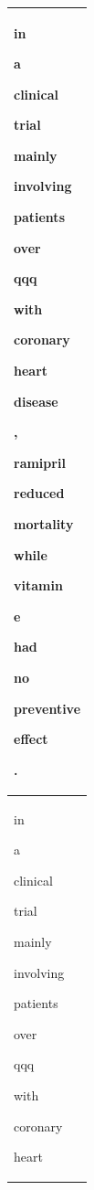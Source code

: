 \documentclass[11pt,a4paper]{article}
\begin{document}
\begin{table}
\small
    \centering
    \begin{tabularx}{\columnwidth}{X}
         {\setlength{\fboxsep}{0pt}\colorbox{red!16!white}{\strut in}}
{\setlength{\fboxsep}{0pt}\colorbox{red!22!white}{\strut a}}
{\setlength{\fboxsep}{0pt}\colorbox{red!24!white}{\strut clinical}}
{\setlength{\fboxsep}{0pt}\colorbox{red!13!white}{\strut trial}}
{\setlength{\fboxsep}{0pt}\colorbox{red!12!white}{\strut mainly}}
{\setlength{\fboxsep}{0pt}\colorbox{red!18!white}{\strut involving}}
{\setlength{\fboxsep}{0pt}\colorbox{red!23!white}{\strut patients}}
{\setlength{\fboxsep}{0pt}\colorbox{red!49!white}{\strut over}}
{\setlength{\fboxsep}{0pt}\colorbox{red!80!white}{\strut qqq}}
{\setlength{\fboxsep}{0pt}\colorbox{red!100!white}{\strut with}}
{\setlength{\fboxsep}{0pt}\colorbox{red!77!white}{\strut coronary}}
{\setlength{\fboxsep}{0pt}\colorbox{red!74!white}{\strut heart}}
{\setlength{\fboxsep}{0pt}\colorbox{red!82!white}{\strut disease}}
{\setlength{\fboxsep}{0pt}\colorbox{red!82!white}{\strut ,}}
{\setlength{\fboxsep}{0pt}\colorbox{red!47!white}{\strut ramipril}}
{\setlength{\fboxsep}{0pt}\colorbox{red!9!white}{\strut reduced}}
{\setlength{\fboxsep}{0pt}\colorbox{red!0!white}{\strut mortality}}
{\setlength{\fboxsep}{0pt}\colorbox{red!0!white}{\strut while}}
{\setlength{\fboxsep}{0pt}\colorbox{red!0!white}{\strut vitamin}}
{\setlength{\fboxsep}{0pt}\colorbox{red!0!white}{\strut e}}
{\setlength{\fboxsep}{0pt}\colorbox{red!0!white}{\strut had}}
{\setlength{\fboxsep}{0pt}\colorbox{red!10!white}{\strut no}}
{\setlength{\fboxsep}{0pt}\colorbox{red!10!white}{\strut preventive}}
{\setlength{\fboxsep}{0pt}\colorbox{red!9!white}{\strut effect}}
{\setlength{\fboxsep}{0pt}\colorbox{red!0!white}{\strut .}} \\[2pt] \hline
{\setlength{\fboxsep}{0pt}\colorbox{green!11!white}{\strut in}}
{\setlength{\fboxsep}{0pt}\colorbox{green!15!white}{\strut a}}
{\setlength{\fboxsep}{0pt}\colorbox{green!16!white}{\strut clinical}}
{\setlength{\fboxsep}{0pt}\colorbox{green!4!white}{\strut trial}}
{\setlength{\fboxsep}{0pt}\colorbox{green!1!white}{\strut mainly}}
{\setlength{\fboxsep}{0pt}\colorbox{green!1!white}{\strut involving}}
{\setlength{\fboxsep}{0pt}\colorbox{green!3!white}{\strut patients}}
{\setlength{\fboxsep}{0pt}\colorbox{green!5!white}{\strut over}}
{\setlength{\fboxsep}{0pt}\colorbox{green!8!white}{\strut qqq}}
{\setlength{\fboxsep}{0pt}\colorbox{green!6!white}{\strut with}}
{\setlength{\fboxsep}{0pt}\colorbox{green!3!white}{\strut coronary}}
{\setlength{\fboxsep}{0pt}\colorbox{green!1!white}{\strut heart}}

\end{tabularx}
\end{table}
\end{document}
